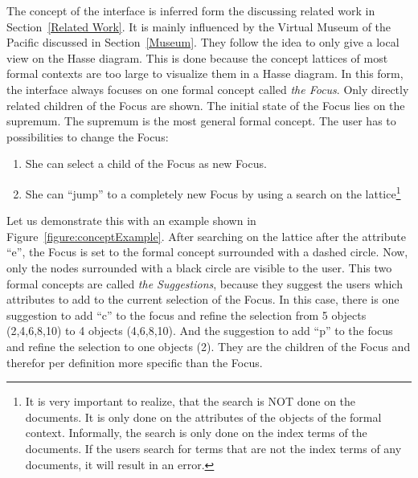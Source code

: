 \documentclass[11pt]{report}
\begin{document}
The concept of the interface is inferred form the discussing related work in Section~\ref{Related Work}. It is mainly influenced by the Virtual Museum of the Pacific discussed in Section~\ref{Museum}. They follow the idea to only give a local view on the Hasse diagram. This is done because the concept lattices of most formal contexts are too large to visualize them in a Hasse diagram. In this form, the interface always focuses on one formal concept called \textit{the Focus}. Only directly related children of the Focus are shown. The initial state of the Focus lies on the supremum. The supremum is the most general formal concept. The user has to possibilities to change the Focus:
\begin{enumerate}
	\item She can select a child of the Focus as new Focus.
	\item She can ``jump'' to a completely new Focus by using a search on the lattice\footnote{It is very important to realize, that the search is NOT done on the documents. It is only done on the attributes of the objects of the formal context. Informally, the search is only done on the index terms of the documents. If the users search for terms that are not the index terms of any documents, it will result in an error.}
\end{enumerate}
Let us demonstrate this with an example shown in Figure~\ref{figure:conceptExample}. After searching on the lattice after the attribute ``e'', the Focus is set to the formal concept surrounded with a dashed circle. Now, only the nodes surrounded with a black circle are visible to the user. This two formal concepts are called \textit{the Suggestions}, because they suggest the users which attributes to add to the current selection of the Focus. In this case, there is one suggestion to add ``c'' to the focus and refine the selection from 5 objects (2,4,6,8,10) to 4 objects (4,6,8,10). And the suggestion to add ``p'' to the focus and refine the selection to one objects (2). They are the children of the Focus and therefor per definition more specific than the Focus. \\
\end{document}

